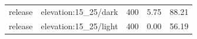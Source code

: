 \begin{longtable}{l>{\raggedright\arraybackslash}p{.42\linewidth}rrr}
release & %
elevation:15\_\allowbreak{}25/dark & %
400 & %
5.75 & %
88.21 \\ %

release & %
elevation:15\_\allowbreak{}25/light & %
400 & %
0.00 & %
56.19 \\ %


\end{longtable}
